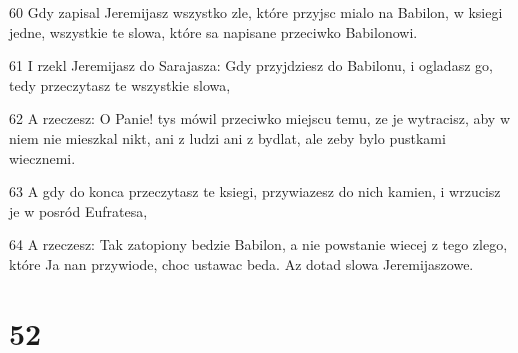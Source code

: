 \par 60 Gdy zapisal Jeremijasz wszystko zle, które przyjsc mialo na Babilon, w ksiegi jedne, wszystkie te slowa, które sa napisane przeciwko Babilonowi.
\par 61 I rzekl Jeremijasz do Sarajasza: Gdy przyjdziesz do Babilonu, i ogladasz go, tedy przeczytasz te wszystkie slowa,
\par 62 A rzeczesz: O Panie! tys mówil przeciwko miejscu temu, ze je wytracisz, aby w niem nie mieszkal nikt, ani z ludzi ani z bydlat, ale zeby bylo pustkami wiecznemi.
\par 63 A gdy do konca przeczytasz te ksiegi, przywiazesz do nich kamien, i wrzucisz je w posród Eufratesa,
\par 64 A rzeczesz: Tak zatopiony bedzie Babilon, a nie powstanie wiecej z tego zlego, które Ja nan przywiode, choc ustawac beda. Az dotad slowa Jeremijaszowe.

\chapter{52}


